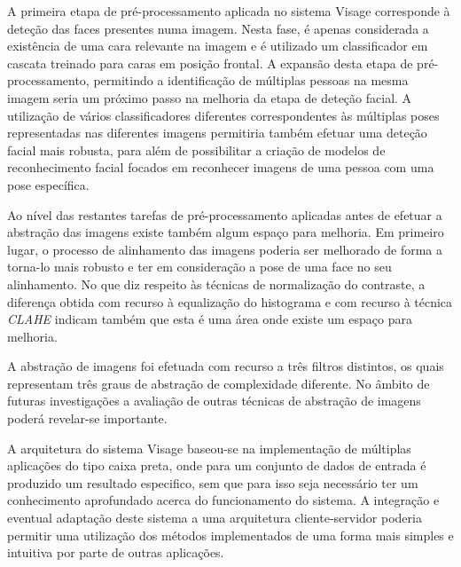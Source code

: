 A primeira etapa de pré-processamento aplicada no sistema Visage corresponde à deteção das faces presentes numa imagem. Nesta fase, é apenas considerada a existência de uma cara relevante na imagem e é utilizado um classificador em cascata treinado para caras em posição frontal. A expansão desta etapa de pré-processamento, permitindo a identificação de múltiplas pessoas na mesma imagem seria um próximo passo na melhoria da etapa de deteção facial. A utilização de vários classificadores diferentes correspondentes às múltiplas poses representadas nas diferentes imagens permitiria também efetuar uma deteção facial mais robusta, para além de possibilitar a criação de modelos de reconhecimento facial focados em reconhecer imagens de uma pessoa com uma pose específica.

Ao nível das restantes tarefas de pré-processamento aplicadas antes de efetuar a abstração das imagens existe também algum espaço para melhoria. Em primeiro lugar, o processo de alinhamento das imagens poderia ser melhorado de forma a torna-lo mais robusto e ter em consideração a pose de uma face no seu alinhamento. No que diz respeito às técnicas de normalização do contraste, a diferença obtida com recurso à equalização do histograma e com recurso à técnica \textit{CLAHE} indicam também que esta é uma área onde existe um espaço para melhoria.

A abstração de imagens foi efetuada com recurso a três filtros distintos, os quais representam três graus de abstração de complexidade diferente. No âmbito de futuras investigações a avaliação de outras técnicas de abstração de imagens poderá revelar-se importante.

A arquitetura do sistema Visage baseou-se na implementação de múltiplas aplicações do tipo caixa preta, onde para um conjunto de dados de entrada é produzido um resultado especifico, sem que para isso seja necessário ter um conhecimento aprofundado acerca do funcionamento do sistema. A integração e eventual adaptação deste sistema a uma arquitetura cliente-servidor poderia permitir uma utilização dos métodos implementados de uma forma mais simples e intuitiva por parte de outras aplicações.


